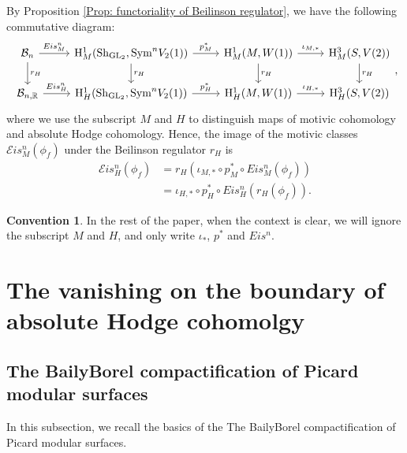 \documentclass[11pt, a4paper]{amsart}
\theoremstyle{plain}
\theoremstyle{definition}
\newtheorem{convention}[theorem]{Convention}
\numberwithin{equation}{section}
\def\RR{\mathbb{R}}
\DeclareMathOperator{\GL}{\mathrm{GL}}
\newcommand{\Sh}{\mathrm{Sh}}
\begin{document}
By Proposition \ref{Prop: functoriality of Beilinson regulator}, we have the following commutative diagram: 
\[
    \begin{tikzcd}
        \mathcal{B}_n \ar[r, "Eis^n_M"] \ar[d, "r_{H}"] & \mathrm{H}^{1}_{M}(\Sh_{\GL_2}, \mathrm{Sym}^{n}V_2(1)) \ar[r, "p^{*}_{M}"] \ar[d, "r_{H}"] & \mathrm{H}^{1}_{M}(M, W(1)) \ar[r, "\iota_{M, *}"] \ar[d,"r_{H}"] & \mathrm{H}^{3}_{M}(S,V(2)) \ar[d, "r_{H}"] \\
        \mathcal{B}_{n, \RR} \ar[r, "Eis^n_H"]  & \mathrm{H}^{1}_{H}(\Sh_{\GL_2}, \mathrm{Sym}^{n}V_2(1)) \ar[r, "p^{*}_{H}"] & \mathrm{H}^{1}_{H}(M, W(1)) \ar[r, "\iota_{H, *}"]  &  \mathrm{H}^{3}_{H}(S,V(2))
    \end{tikzcd}, 
\]
where we use the subscript $M$ and $H$ to distinguish maps of motivic cohomology and absolute Hodge cohomology. 
Hence, the image of the motivic classes $\mathcal{E}is_{M}^{n}(\phi_f)$ under the Beilinson regulator $r_{H}$ is 
\begin{align*}
    \mathcal{E}is_{H}^{n}(\phi_f) &= r_{H} (\iota_{M, *} \circ p_{M}^{*} \circ Eis_{M}^{n}(\phi_{f})) \\
                                  &= \iota_{H, *} \circ p_{H}^{*} \circ Eis_{H}^{n}(r_{H} (\phi_{f})). 
\end{align*}    

\begin{convention}
    In the rest of the paper, when the context is clear, we will ignore the subscript $M$ and $H$, and only write $\iota_{*}$, $p^{*}$ and $Eis^{n}$. 
\end{convention}






\section{The vanishing on the boundary of absolute Hodge cohomolgy}
\label{Sec: vanishing of the boudary abs Hodge}
\subsection{The Baily{\textendash}Borel compactification of Picard modular surfaces}
\label{SS: Baily-Borel compactification of PMF} 
In this subsection, we recall the basics of the The Baily{\textendash}Borel compactification of Picard modular surfaces.
\end{document}
